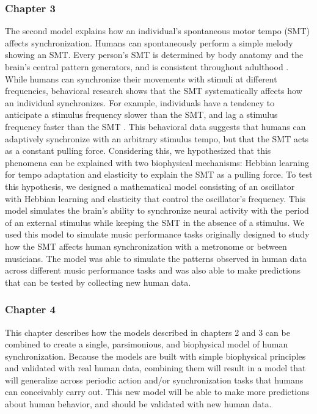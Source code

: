 \documentclass{report}
\begin{document}
\subsubsection{Chapter 3}
The second model explains how an individual’s spontaneous motor tempo (SMT) affects synchronization. Humans can spontaneously perform a simple melody showing an SMT. Every person’s SMT is determined by body anatomy and the brain's central pattern generators, and is consistent throughout adulthood \cite{scheurich2018tapping}. While humans can synchronize their movements with stimuli at different frequencies, behavioral research shows that the SMT systematically affects how an individual synchronizes. For example, individuals have a tendency to anticipate a stimulus frequency slower than the SMT, and lag a stimulus frequency faster than the SMT \cite{scheurich2018tapping}. This behavioral data suggests that humans can adaptively synchronize with an arbitrary stimulus tempo, but that the SMT acts as a constant pulling force. Considering this, we hypothesized that this phenomena can be explained with two biophysical mechanisms: Hebbian learning for tempo adaptation and elasticity to explain the SMT as a pulling force. To test this hypothesis, we designed a mathematical model consisting of an oscillator with Hebbian learning and elasticity that control the oscillator's frequency. This model simulates the brain's ability to synchronize neural activity with the period of an external stimulus while keeping the SMT in the absence of a stimulus. We used this model to simulate music performance tasks originally designed to study how the SMT affects human synchronization with a metronome or between musicians. The model was able to simulate the patterns observed in human data across different music performance tasks and was also able to make predictions that can be tested by collecting new human data.

\subsubsection{Chapter 4}
This chapter describes how the models described in chapters 2 and 3 can be combined to create a single, parsimonious, and biophysical model of human synchronization. Because the models are built with simple biophysical principles and validated with real human data, combining them will result in a model that will generalize across periodic action and/or synchronization tasks that humans can conceivably carry out. This new model will be able to make more predictions about human behavior, and should be validated with new human data.
\end{document}
